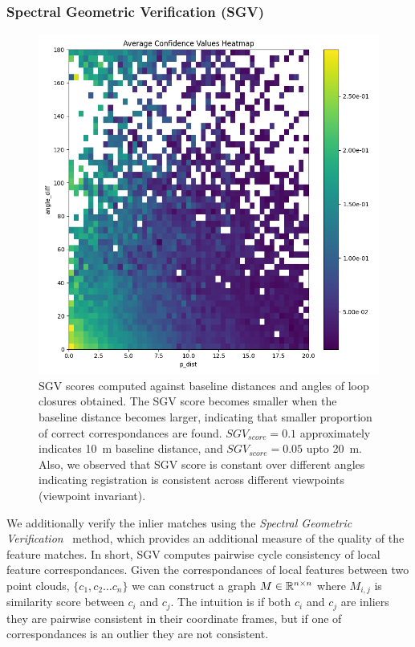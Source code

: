 \subsubsection*{\textbf{Spectral Geometric Verification (SGV)}}
\begin{figure}[t]
  \centering
  \includegraphics*[width=0.8\columnwidth]{pics/methods_svg_distance.png}
  \caption{SGV scores computed against baseline distances and angles of loop closures obtained. The SGV score becomes smaller when the baseline distance becomes larger, indicating that smaller proportion of correct correspondances are found. $SGV_{score}=0.1$ approximately indicates \SI{10}{\meter} baseline distance, and $SGV_{score}=0.05$ upto \SI{20}{\meter}. Also, we observed that SGV score is constant over different angles indicating registration is consistent across different viewpoints (viewpoint invariant).}
  \label{fig:sgv_distance}
\end{figure}

We additionally verify the inlier matches using the \emph{Spectral Geometric Verification}~\cite{vidanapathirana2023ral} method, which provides an additional measure of the quality of the feature matches. In short, SGV computes pairwise cycle consistency of local feature correspondances. Given the correspondances of local features between two point clouds, $\{c_1, c_2 \ldots c_n\}$ we can construct a graph $M \in \mathbb{R}^{n \times n}$ where $M_{i,j}$ is similarity score between $c_i$ and $c_j$. The intuition is if both $c_i$ and $c_j$ are inliers they are pairwise consistent in their coordinate frames, but if one of correspondances is an outlier they are not consistent. 

